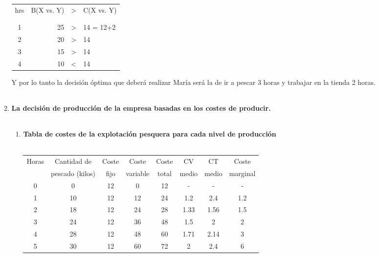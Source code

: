\begin{enumerate}
\begin{enumerate}[\bfseries 2.1]
		\begin{tcolorbox}[colframe=white]
		    \begin{center}
			\begin{tabular}{crcl}
			    hrs&B(X vs. Y)&>&C(X vs. Y)\\\\
			    \hline\\
			       1&25&>&14 = 12+2\\
			       2&20&>&14\\
			       3&15&>&14\\
			       4&10&<&14\\
			\end{tabular}
		    \end{center}
		\end{tcolorbox}

		Y por lo tanto la decisión óptima que deberá realizar María será la de ir a pescar 3 horas y trabajar en la tienda 2 horas.\\\\

	    \item \textbf{La decisión de producción de la empresa basadas en los costes de producir.}\\\\

		\begin{enumerate}[\bfseries a)]

		    \item \textbf{Tabla de costes de la explotación pesquera para cada nivel de producción}\\\\
		    \begin{tcolorbox}[colframe=white]
			\begin{center}
			    \begin{tabular}{|c|c|c|c|c|c|c|c|}
				     \hline
				Horas&Cantidad de &Coste&Coste&Coste&CV&CT&Coste\\
				     &pescado (kilos)&fijo&variable&total&medio&medio&marginal\\
				     \hline
				     0&0&12&0&12&-&-&-\\
				     1&10&12&12&24&1.2 &2.4 &1.2\\
				     2&18&12&24&28&1.33&1.56&1.5\\
				     3&24&12&36&48&1.5 &2   &2\\
				     4&28&12&48&60&1.71&2.14&3\\
				     5&30&12&60&72&2   &2.4 &6\\
				     \hline
			    \end{tabular}
			\end{center}
		    \end{tcolorbox}
		    \vspace{1cm}


\end{enumerate}
\end{enumerate}
\end{enumerate}
